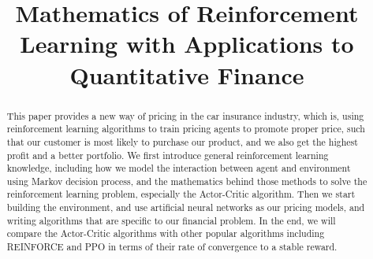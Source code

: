 \documentclass[balance,upint,subscriptcorrection,varvw,mathalfa=cal=boondoxo,pdf-a,nofoot]{asmeconf}
\begin{document}
\title{
    Mathematics of Reinforcement Learning with Applications to Quantitative 
    Finance
}



\maketitle


\begin{abstract}
\noindent This paper provides a new way of pricing in the car insurance
industry, which is, using reinforcement learning algorithms to train pricing 
agents to promote proper price, such that our customer is most likely to 
purchase our product, and we also get the highest profit and a better 
portfolio. 
We first introduce general reinforcement learning knowledge, including how 
we model the interaction between agent and environment using Markov decision
process, and the mathematics behind those methods to solve the reinforcement 
learning problem, especially the Actor-Critic algorithm.
Then we start building the environment, and use artificial neural networks as 
our pricing models, and writing algorithms that are specific to our financial 
problem. 
In the end, we will compare the Actor-Critic algorithms with other popular 
algorithms including REINFORCE and PPO in terms of their rate of convergence 
to a stable reward.
\end{abstract}
\end{document}
